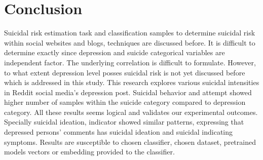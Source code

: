 \documentclass[sn-mathphys,Numbered]{sn-jnl}%
\theoremstyle{thmstyleone}%
\theoremstyle{thmstyletwo}%
\theoremstyle{thmstylethree}%
\begin{document}
%        
\section{Conclusion} 
\label{conclu}
Suicidal risk estimation task and classification samples to determine suicidal risk within social websites and blogs, techniques are discussed before. It is difficult to determine exactly since depression and suicide categorical variables are independent factor. The underlying correlation is difficult to formulate. However, to what extent depression level posses suicidal risk is not yet discussed before which is addressed in this study. This research explores various suicidal intensities in Reddit social media's depression post. Suicidal behavior and attempt showed higher number of samples within the suicide category compared to depression category. All these results seems logical and validates our experimental outcomes. Specially suicidal ideation, indicator showed similar patterns, expressing that depressed persons' comments has suicidal ideation and suicidal indicating symptoms. Results are susceptible to chosen classifier, chosen dataset, pretrained models vectors or embedding provided to the classifier. 
\end{document}
